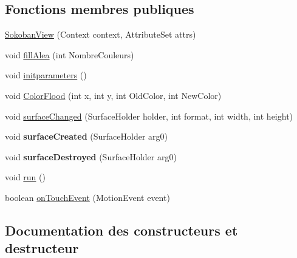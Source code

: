 \subsection*{Fonctions membres publiques}
\begin{DoxyCompactItemize}
\item 
\hyperlink{classp8_1_1demo_1_1p8sokoban_1_1_sokoban_view_a9b77c402af6779c46c11e0bd6572eeec}{Sokoban\+View} (Context context, Attribute\+Set attrs)
\item 
void \hyperlink{classp8_1_1demo_1_1p8sokoban_1_1_sokoban_view_a69207fcf45a27f3516d24fb087428ae7}{fill\+Alea} (int Nombre\+Couleurs)
\item 
void \hyperlink{classp8_1_1demo_1_1p8sokoban_1_1_sokoban_view_aae2d77f292a6cc7b5e4b68f0c8df0243}{initparameters} ()
\item 
void \hyperlink{classp8_1_1demo_1_1p8sokoban_1_1_sokoban_view_a72d3a3f62698678446745c2ddbddb6aa}{Color\+Flood} (int x, int y, int Old\+Color, int New\+Color)
\item 
void \hyperlink{classp8_1_1demo_1_1p8sokoban_1_1_sokoban_view_a6f555dde84f49e730114c5585e444e2b}{surface\+Changed} (Surface\+Holder holder, int format, int width, int height)
\item 
\hypertarget{classp8_1_1demo_1_1p8sokoban_1_1_sokoban_view_a4b9325992cfbf98b878f11b75909edac}{}void {\bfseries surface\+Created} (Surface\+Holder arg0)\label{classp8_1_1demo_1_1p8sokoban_1_1_sokoban_view_a4b9325992cfbf98b878f11b75909edac}

\item 
\hypertarget{classp8_1_1demo_1_1p8sokoban_1_1_sokoban_view_a0b190fc3dd3e36091c512adb6d827172}{}void {\bfseries surface\+Destroyed} (Surface\+Holder arg0)\label{classp8_1_1demo_1_1p8sokoban_1_1_sokoban_view_a0b190fc3dd3e36091c512adb6d827172}

\item 
void \hyperlink{classp8_1_1demo_1_1p8sokoban_1_1_sokoban_view_a6c6c4a3e01b49c9b46fbf698eda4ad5a}{run} ()
\item 
boolean \hyperlink{classp8_1_1demo_1_1p8sokoban_1_1_sokoban_view_a7447a5c085cc25b6be162b832a358700}{on\+Touch\+Event} (Motion\+Event event)
\end{DoxyCompactItemize}


\subsection{Documentation des constructeurs et destructeur}
\hypertarget{classp8_1_1demo_1_1p8sokoban_1_1_sokoban_view_a9b77c402af6779c46c11e0bd6572eeec}{}
